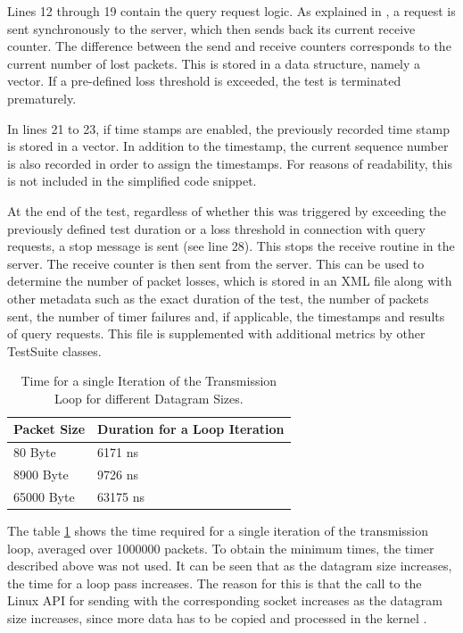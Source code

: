 Lines 12 through 19 contain the query request logic. As explained in \label{chap:targetcom:query}, a request is sent synchronously to the server, which then sends back its current receive counter. The difference between the send and receive counters corresponds to the current number of lost packets. This is stored in a data structure, namely a vector. If a pre-defined loss threshold is exceeded, the test is terminated prematurely.

In lines 21 to 23, if time stamps are enabled, the previously recorded time stamp is stored in a vector. In addition to the timestamp, the current sequence number is also recorded in order to assign the timestamps. For reasons of readability, this is not included in the simplified code snippet.

At the end of the test, regardless of whether this was triggered by exceeding the previously defined test duration or a loss threshold in connection with query requests, a stop message is sent (see line 28). This stops the receive routine in the server. The receive counter is then sent from the server. This can be used to determine the number of packet losses, which is stored in an XML file along with other metadata such as the exact duration of the test, the number of packets sent, the number of timer failures and, if applicable, the timestamps and results of query requests. This file is supplemented with additional metrics by other TestSuite classes.

\begin{table}[h]
\centering
\begin{tabular}{l|l}
	\toprule
	\textbf{Packet Size} & \textbf{Duration for a Loop Iteration} \\
	\midrule
	80 Byte & 6171 ns\\
	8900 Byte & 9726 ns\\
	65000 Byte & 63175 ns\\
	\bottomrule
\end{tabular}
\caption{Time for a single Iteration of the Transmission Loop for different Datagram Sizes.}
\label{tab:senditertime}
\end{table}

The table \ref{tab:senditertime} shows the time required for a single iteration of the transmission loop, averaged over 1000000 packets. To obtain the minimum times, the timer described above was not used. It can be seen that as the datagram size increases, the time for a loop pass increases. The reason for this is that the call to the Linux API for sending with the corresponding socket increases as the datagram size increases, since more data has to be copied and processed in the kernel \cite{tsgen03}.

